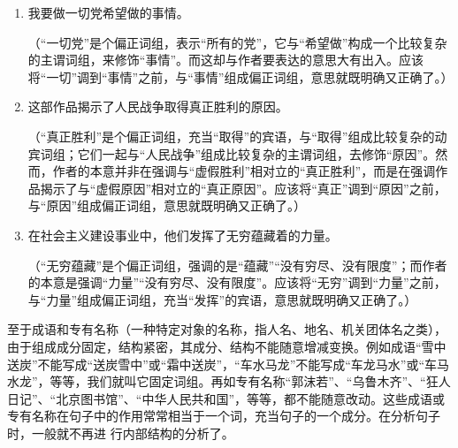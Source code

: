 \begin{enumerate}[label=\textcircled{\arabic*}]
\item 我要做一切党希望做的事情。

（“一切党”是个偏正词组，表示“所有的党”，它与“希望做”构成一个比较复杂的主谓词组，来修饰“事情”。而这却与作者要表达的意思大有出入。应该将“一切”调到“事情”之前，与“事情”组成偏正词组，意思就既明确又正确了。）

\item 这部作品揭示了人民战争取得真正胜利的原因。

（“真正胜利”是个偏正词组，充当“取得”的宾语，与“取得”组成比较复杂的动宾词组；它们一起与“人民战争”组成比较复杂的主谓词组，去修饰“原因”。然而，作者的本意并非在强调与“虚假胜利”相对立的“真正胜利”，而是在强调作品揭示了与“虚假原因”相对立的“真正原因”。应该将“真正”调到“原因”之前，与“原因”组成偏正词组，意思就既明确又正确了。）

\item 在社会主义建设事业中，他们发挥了无穷蕴藏着的力量。

（“无穷蕴藏”是个偏正词组，强调的是“蕴藏”“没有穷尽、没有限度”；而作者的本意是强调“力量”“没有穷尽、没有限度”。应该将“无穷”调到“力量”之前，与“力量”组成偏正词组，充当“发挥”的宾语，意思就既明确又正确了。）
\end{enumerate}

至于成语和专有名称（一种特定对象的名称，指人名、地名、机关团体名之类），由于组成成分固定，结构紧密，其成分、结构不能随意增减变换。例如成语“雪中送炭”不能写成“送炭雪中”或“霜中送炭”，“车水马龙”不能写成“车龙马水”或“车马水龙”，等等，我们就叫它固定词组。再如专有名称“郭沫若”、“乌鲁木齐”、“狂人日记”、“北京图书馆”、“中华人民共和国”，等等，都不能随意改动。这些成语或专有名称在句子中的作用常常相当于一个词，充当句子的一个成分。在分析句子时，一般就不再进 行内部结构的分析了。
\newpage